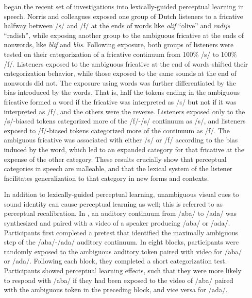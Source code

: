 \citet{Norris2003} began the recent set of investigations into lexically-guided perceptual learning in speech.
Norris and colleagues exposed one group of Dutch listeners to a fricative halfway between /s/ and /f/ at the ends of words like \emph{olif} ``olive'' and \emph{radijs} ``radish'', while exposing another group to the ambiguous fricative at the ends of nonwords, like \emph{blif} and \emph{blis}.
Following exposure, both groups of listeners were tested on their categorization of a fricative continuum from 100\% /s/ to 100\% /f/. 
Listeners exposed to the ambiguous fricative at the end of words shifted their categorization behavior, while those exposed to the same sounds at the end of nonwords did not.  The exposure using words was further differentiated by the bias introduced by the words.  That is, half the tokens ending in the ambiguous fricative formed a word if the fricative was interpreted as /s/ but not if it was interpreted as /f/, and the others were the reverse.  
Listeners exposed only to the /s/-biased tokens categorized more of the /f/-/s/ continuum as /s/, and listeners exposed to /f/-biased tokens categorized more of the continuum as /f/.  
The ambiguous fricative was associated with either /s/ or /f/ according to the bias induced by the word, which led to an expanded category for that fricative at the expense of the other category.
These results crucially show that perceptual categories in speech are malleable, and that the lexical system of the listener facilitates generalization to that category in new forms and contexts.

In addition to lexically-guided perceptual learning, unambiguous visual cues to sound identity can cause perceptual learning as well; this is referred to as perceptual recalibration.
In \citet{Bertelson2003}, an auditory continuum from /aba/ to /ada/ was synthesized and paired with a video of a speaker producing /aba/ or /ada/.  
Participants first completed a pretest that identified the maximally ambiguous step of the /aba/-/ada/ auditory continuum. 
In eight blocks, participants were randomly exposed to the ambiguous auditory token paired with video for /aba/ or /ada/.  Following each block, they completed a short categorization test.  
Participants showed perceptual learning effects, such that they were more likely to respond with /aba/ if they had been exposed to the video of /aba/ paired with the ambiguous token in the preceding block, and vice versa for /ada/.

